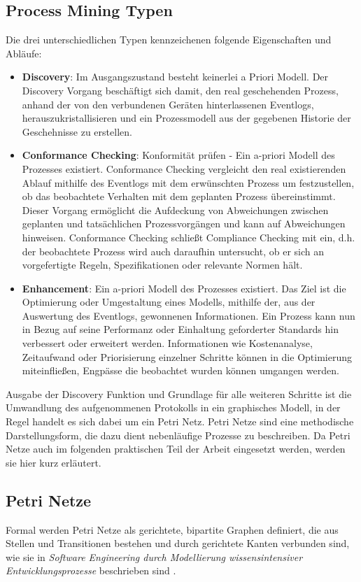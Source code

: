 \newpage
\subsection{Process Mining Typen}
Die drei unterschiedlichen Typen kennzeichenen folgende Eigenschaften und Abläufe:
\begin{itemize}
\item \textbf{Discovery}: Im Ausgangszustand besteht keinerlei a Priori Modell. Der Discovery Vorgang beschäftigt sich damit, den real geschehenden Prozess, anhand der von den verbundenen Geräten hinterlassenen Eventlogs, herauszukristallisieren und ein Prozessmodell aus der gegebenen Historie der Geschehnisse zu erstellen.

\item \textbf{Conformance Checking}: Konformität prüfen - Ein a-priori Modell des Prozesses existiert. Conformance Checking vergleicht den real existierenden Ablauf mithilfe des Eventlogs mit dem erwünschten Prozess um festzustellen, ob das beobachtete Verhalten mit dem geplanten Prozess übereinstimmt. Dieser Vorgang ermöglicht die Aufdeckung von Abweichungen zwischen geplanten und tatsächlichen Prozessvorgängen und kann auf Abweichungen hinweisen.  Conformance Checking schließt Compliance Checking mit ein, d.h. der beobachtete Prozess wird auch daraufhin untersucht, ob er sich an vorgefertigte Regeln, Spezifikationen oder relevante Normen hält.

\item \textbf{Enhancement}: Ein a-priori Modell des Prozesses existiert. Das Ziel ist die Optimierung oder Umgestaltung eines Modells, mithilfe der, aus der Auswertung des Eventlogs, gewonnenen Informationen. Ein Prozess kann nun in Bezug auf seine Performanz oder Einhaltung geforderter Standards hin verbessert oder erweitert werden. Informationen wie Kostenanalyse, Zeitaufwand oder Priorisierung einzelner Schritte können in die Optimierung miteinfließen, Engpässe die beobachtet  wurden können umgangen werden.
\end{itemize}

Ausgabe der Discovery Funktion und Grundlage für alle weiteren Schritte ist die Umwandlung des aufgenommenen Protokolls in ein graphisches Modell, in der Regel handelt es sich dabei um ein Petri Netz. Petri Netze sind eine methodische Darstellungsform, die dazu dient nebenläufige Prozesse zu beschreiben. Da Petri Netze auch im folgenden praktischen Teil der Arbeit eingesetzt werden, werden sie hier kurz erläutert. 

\subsection{Petri Netze}
Formal werden Petri Netze als gerichtete, bipartite Graphen definiert, die aus Stellen  und  Transitionen  bestehen und durch  gerichtete  Kanten  verbunden sind, wie sie in \textit{Software Engineering durch Modellierung wissensintensiver Entwicklungsprozesse} beschrieben sind \cite{freund2007software}. 


